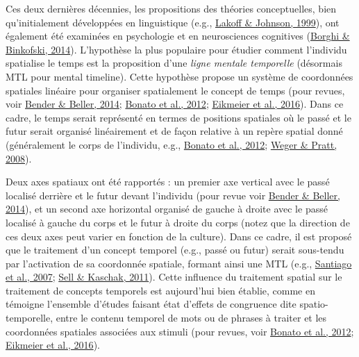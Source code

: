 \documentclass[
  a4paper,12pt,twoside,onecolumn,openright,final,oldfontcommands]{memoir}
\begin{document}
Ces deux dernières décennies, les propositions des théories conceptuelles, bien qu'initialement développées en linguistique (e.g., \protect\hyperlink{ref-lakoff_philosophy_1999}{Lakoff \& Johnson, 1999}), ont également été examinées en psychologie et en neurosciences cognitives (\protect\hyperlink{ref-borghi_words_2014}{Borghi \& Binkofski, 2014}). L'hypothèse la plus populaire pour étudier comment l'individu spatialise le temps est la proposition d'une \emph{ligne mentale temporelle} (désormais MTL pour mental timeline). Cette hypothèse propose un système de coordonnées spatiales linéaire pour organiser spatialement le concept de temps (pour revues, voir \protect\hyperlink{ref-bender_mapping_2014}{Bender \& Beller, 2014}; \protect\hyperlink{ref-bonato_when_2012}{Bonato et al., 2012}; \protect\hyperlink{ref-lewandowska-tomaszczyk_mental_2016}{Eikmeier et al., 2016}). Dans ce cadre, le temps serait représenté en termes de positions spatiales où le passé et le futur serait organisé linéairement et de façon relative à un repère spatial donné (généralement le corps de l'individu, e.g., \protect\hyperlink{ref-bonato_when_2012}{Bonato et al., 2012}; \protect\hyperlink{ref-weger_time_2008}{Weger \& Pratt, 2008}).

Deux axes spatiaux ont été rapportés : un premier axe vertical avec le passé localisé derrière et le futur devant l'individu (pour revue voir \protect\hyperlink{ref-bender_mapping_2014}{Bender \& Beller, 2014}), et un second axe horizontal organisé de gauche à droite avec le passé localisé à gauche du corps et le futur à droite du corps (notez que la direction de ces deux axes peut varier en fonction de la culture). Dans ce cadre, il est proposé que le traitement d'un concept temporel (e.g., passé ou futur) serait sous-tendu par l'activation de sa coordonnée spatiale, formant ainsi une MTL (e.g., \protect\hyperlink{ref-santiago_time_2007}{Santiago et al., 2007}; \protect\hyperlink{ref-sell_processing_2011}{Sell \& Kaschak, 2011}). Cette influence du traitement spatial sur le traitement de concepts temporels est aujourd'hui bien établie, comme en témoigne l'ensemble d'études faisant état d'effets de congruence dite spatio-temporelle, entre le contenu temporel de mots ou de phrases à traiter et les coordonnées spatiales associées aux stimuli (pour revues, voir \protect\hyperlink{ref-bonato_when_2012}{Bonato et al., 2012}; \protect\hyperlink{ref-lewandowska-tomaszczyk_mental_2016}{Eikmeier et al., 2016}).
\end{document}
